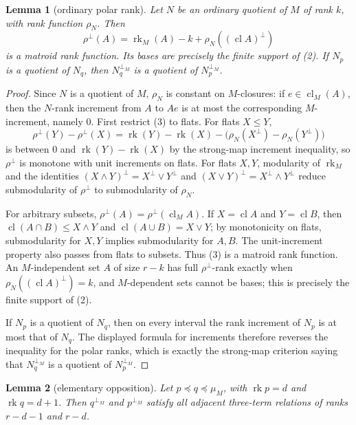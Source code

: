\documentclass[12pt]{article}
\newcommand{\rk}{\operatorname{rk}}
\newcommand{\cl}{\operatorname{cl}}
\newtheorem{lemma}{Lemma}
\begin{document}
\begin{lemma}[ordinary polar rank]\label{lem:ordinary}
Let $N$ be an ordinary quotient of $M$ of rank $k$, with rank function
$\rho_N$.  Then
\[
        \rho^\perp(A)=\rk_M(A)-k+\rho_N((\cl A)^\perp)          \tag{3}
\]
is a matroid rank function.  Its bases are precisely the finite support
of (2).  If $N_p$ is a quotient of $N_q$, then
$N_q^{\perp_M}$ is a quotient of $N_p^{\perp_M}$.
\end{lemma}

\begin{proof}
Since $N$ is a quotient of $M$, $\rho_N$ is constant on $M$-closures:
if $e\in\cl_M(A)$, then the $N$-rank increment from $A$ to $Ae$ is at
most the corresponding $M$-increment, namely $0$.  First restrict (3) to
flats.  For flats $X\le Y$,
\[
\rho^\perp(Y)-\rho^\perp(X)
 =\rk(Y)-\rk(X)-\bigl(\rho_N(X^\perp)-\rho_N(Y^\perp)\bigr)
\]
is between $0$ and $\rk(Y)-\rk(X)$ by the strong-map increment
inequality, so $\rho^\perp$ is monotone with unit increments on flats.
For flats $X,Y$, modularity of $\rk_M$ and the identities
$(X\wedge Y)^\perp=X^\perp\vee Y^\perp$ and
$(X\vee Y)^\perp=X^\perp\wedge Y^\perp$ reduce submodularity of
$\rho^\perp$ to submodularity of $\rho_N$.

For arbitrary subsets, $\rho^\perp(A)=\rho^\perp(\cl_M A)$.  If
$X=\cl A$ and $Y=\cl B$, then
$\cl(A\cap B)\le X\wedge Y$ and $\cl(A\cup B)=X\vee Y$; by monotonicity
on flats, submodularity for $X,Y$ implies submodularity for $A,B$.
The unit-increment property also passes from flats to subsets.  Thus
(3) is a matroid rank function.  An $M$-independent set $A$ of size
$r-k$ has full $\rho^\perp$-rank exactly when
$\rho_N((\cl A)^\perp)=k$, and $M$-dependent sets cannot be bases; this
is precisely the finite support of (2).

If $N_p$ is a quotient of $N_q$, then on every interval the rank
increment of $N_p$ is at most that of $N_q$.  The displayed formula for
increments therefore reverses the inequality for the polar ranks, which
is exactly the strong-map criterion saying that $N_q^{\perp_M}$ is a
quotient of $N_p^{\perp_M}$.
\end{proof}

\begin{lemma}[elementary opposition]\label{lem:elementary}
Let $p\preceq q\preceq\mu_M$, with $\rk p=d$ and $\rk q=d+1$.  Then
$q^{\perp_M}$ and $p^{\perp_M}$ satisfy all adjacent three-term
relations of ranks $r-d-1$ and $r-d$.
\end{lemma}
\end{document}
